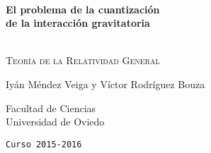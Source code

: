 \begin{titlepage}
\begin{center}


\HRule \\[0.4cm]
{ \huge \bfseries El problema de la cuantización\\de la interacción gravitatoria \\[0.3cm] }

\HRule \\[1.5cm]

\textsc{\Large Teoría de la Relatividad General}\\[1cm]

\vfill

\large{\textsf{Iyán Méndez Veiga y Víctor Rodríguez Bouza}}


\textmd{Facultad de Ciencias \\
Universidad de Oviedo}

\texttt{Curso 2015-2016}



\end{center}
\end{titlepage}
